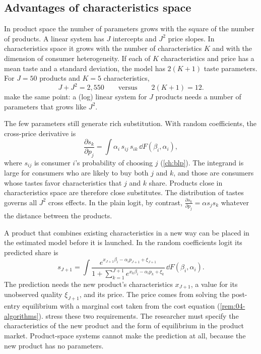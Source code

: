 \subsection{Advantages of characteristics space}\label{sec:04-spaces-adv}

In product space the number of parameters grows with the square of the number of products. A linear system has
$J$ intercepts and $J^2$ price slopes. In characteristics space it grows with the number of characteristics $K$
and with the dimension of consumer heterogeneity. If each of $K$ characteristics and price has a mean taste and a
standard deviation, the model has $2(K + 1)$ taste parameters. For $J = 50$ products and $K = 5$ characteristics,
\begin{equation*}
J + J^2 = 2{,}550 \qquad\text{versus}\qquad 2(K + 1) = 12 .
\end{equation*}
\citet[fn.~1]{BerryPakes2007} make the same point: a (log) linear system for $J$ products needs a number of
parameters that grows like $J^2$.

The few parameters still generate rich substitution. With random coefficients, the cross-price derivative is
\begin{equation}\label{eq:04-rc-cross}
\frac{\partial s_k}{\partial p_j} = \int\alpha_i\,s_{ij}\,s_{ik}\,\dd F(\beta_i, \alpha_i),
\end{equation}
where $s_{ij}$ is consumer $i$'s probability of choosing $j$ (\cref{ch:blp}). The integrand is large for consumers
who are likely to buy both $j$ and $k$, and those are consumers whose tastes favor characteristics that $j$ and $k$
share. Products close in characteristics space are therefore close substitutes. The distribution of tastes governs
all $J^2$ cross effects. In the plain logit, by contrast, $\frac{\partial s_k}{\partial p_j} = \alpha s_j s_k$
whatever the distance between the products.

A product that combines existing characteristics in a new way can be placed in the estimated model before it is
launched. In the random coefficients logit its predicted share is
\begin{equation}\label{eq:04-newgood-share}
s_{J+1} = \int\frac{e^{x_{J+1}\beta_i - \alpha_i p_{J+1} + \xi_{J+1}}}
{1 + \sum_{k=1}^{J+1}e^{x_k\beta_i - \alpha_i p_k + \xi_k}}\,\dd F(\beta_i, \alpha_i).
\end{equation}
The prediction needs the new product's characteristics $x_{J+1}$, a value for its unobserved quality $\xi_{J+1}$,
and its price. The price comes from solving the post-entry equilibrium with a marginal cost taken from the cost
equation (\cref{rem:04-algorithms}). \citet[p.~1]{BerryPakes2007} stress these two requirements. The researcher must
specify the characteristics of the new product and the form of equilibrium in the product market. Product-space
systems cannot make the prediction at all, because the new product has no parameters.

